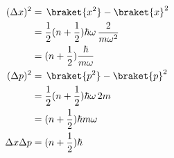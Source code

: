 \documentclass[12pt]{article}
\begin{document}
\subsubsection{} \begin{align*}
    (\Delta x)^2 &=\, \braket{x^2} - \braket{x}^2\\
    &= \frac{1}{2}(n + \frac{1}{2}) \hbar\omega\, \frac{2}{m\omega^2} \\&=  (n + \frac{1}{2}) \frac{\hbar}{m\omega }\\
    (\Delta p)^2 &=\,
    \braket{p^2} - \braket{p}^2\\ &= \frac{1}{2}(n + \frac{1}{2})
    \hbar\omega\, 2m \\&=  (n + \frac{1}{2})
    \hbar m\omega \\
    \Delta x \Delta p &=(n + \frac{1}{2}) \hbar
\end{align*}
\end{document}
